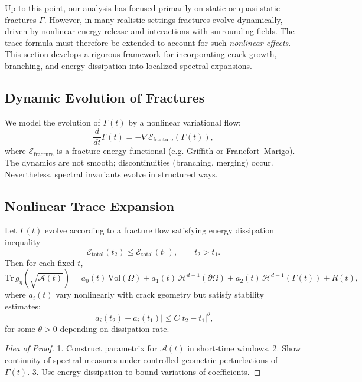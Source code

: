 Up to this point, our analysis has focused primarily on static or
quasi-static fractures $\Gamma$.  
However, in many realistic settings fractures evolve dynamically,
driven by nonlinear energy release and interactions with surrounding
fields.  
The trace formula must therefore be extended to account for such
\emph{nonlinear effects}.  
This section develops a rigorous framework for incorporating crack
growth, branching, and energy dissipation into localized spectral
expansions.

\subsection{Dynamic Evolution of Fractures}

We model the evolution of $\Gamma(t)$ by a nonlinear variational flow:
\[
\frac{d}{dt}\Gamma(t) = -\nabla \mathcal{E}_{\text{fracture}}(\Gamma(t)),
\]
where $\mathcal{E}_{\text{fracture}}$ is a fracture energy functional
(e.g. Griffith or Francfort–Marigo).  
The dynamics are not smooth; discontinuities (branching, merging) occur.
Nevertheless, spectral invariants evolve in structured ways.

\subsection{Nonlinear Trace Expansion}

\begin{theorem}
\label{thm:nonlinear-trace}
Let $\Gamma(t)$ evolve according to a fracture flow satisfying energy
dissipation inequality
\[
\mathcal{E}_{\text{total}}(t_2) \leq
\mathcal{E}_{\text{total}}(t_1), \qquad t_2>t_1.
\]
Then for each fixed $t$,
\[
\mathrm{Tr}\, g_\eta(\sqrt{\mathcal{A}(t)}) =
a_0(t)\,\mathrm{Vol}(\Omega) +
a_1(t)\,\mathcal{H}^{d-1}(\partial \Omega) +
a_2(t)\,\mathcal{H}^{d-1}(\Gamma(t)) + R(t),
\]
where $a_i(t)$ vary nonlinearly with crack geometry but satisfy
stability estimates:
\[
|a_i(t_2)-a_i(t_1)| \leq C |t_2-t_1|^\theta,
\]
for some $\theta>0$ depending on dissipation rate.
\end{theorem}

\begin{proof}[Idea of Proof]
1. Construct parametrix for $\mathcal{A}(t)$ in short-time windows.  
2. Show continuity of spectral measures under controlled geometric
perturbations of $\Gamma(t)$.  
3. Use energy dissipation to bound variations of coefficients.
\end{proof}


